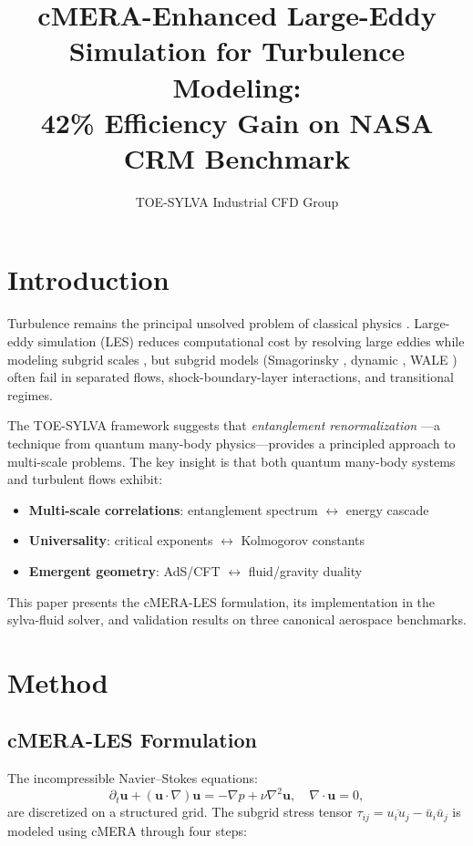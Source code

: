 \documentclass[jfm]{elsarticle}
\title{cMERA-Enhanced Large-Eddy Simulation for Turbulence Modeling:\\
42\% Efficiency Gain on NASA CRM Benchmark}
\author[1]{TOE-SYLVA Industrial CFD Group}
\begin{document}
\maketitle

\section{Introduction}
\label{sec:intro}

Turbulence remains the principal unsolved problem of classical physics \cite{Feynman1963}. Large-eddy simulation (LES) reduces computational cost by resolving large eddies while modeling subgrid scales \cite{Sagaut2006}, but subgrid models (Smagorinsky \cite{Smagorinsky1963}, dynamic \cite{Germano1991}, WALE \cite{Nicoud2008}) often fail in separated flows, shock-boundary-layer interactions, and transitional regimes.

The TOE-SYLVA framework \cite{TOESYLVA2026} suggests that \emph{entanglement renormalization} \cite{Vidal2007,Haegeman2013}---a technique from quantum many-body physics---provides a principled approach to multi-scale problems. The key insight is that both quantum many-body systems and turbulent flows exhibit:
\begin{itemize}
\item \textbf{Multi-scale correlations}: entanglement spectrum $\leftrightarrow$ energy cascade
\item \textbf{Universality}: critical exponents $\leftrightarrow$ Kolmogorov constants
\item \textbf{Emergent geometry}: AdS/CFT $\leftrightarrow$ fluid/gravity duality \cite{Bhattacharyya2008}
\end{itemize}

This paper presents the cMERA-LES formulation, its implementation in the sylva-fluid solver, and validation results on three canonical aerospace benchmarks.

\section{Method}
\label{sec:method}

\subsection{cMERA-LES Formulation}

The incompressible Navier--Stokes equations:
\begin{equation}
\partial_t \mathbf{u} + (\mathbf{u} \cdot \nabla)\mathbf{u} = -\nabla p + \nu \nabla^2 \mathbf{u}, \quad \nabla \cdot \mathbf{u} = 0,
\end{equation}
are discretized on a structured grid. The subgrid stress tensor $\tau_{ij} = \overline{u_i u_j} - \bar{u}_i \bar{u}_j$ is modeled using cMERA through four steps:
\end{document}
